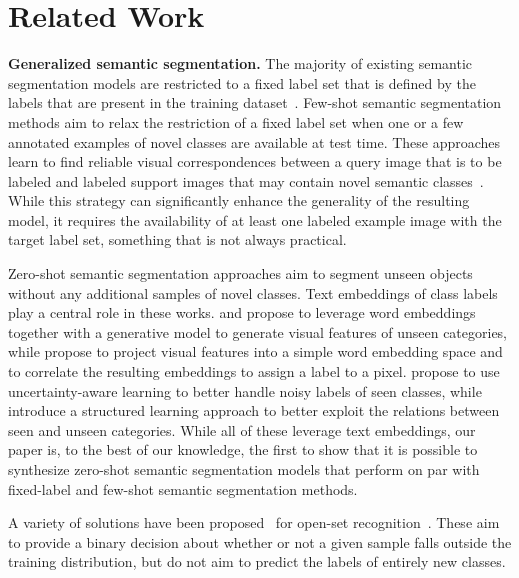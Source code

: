 \section{Related Work}
\label{sec:related_work}

\textbf{Generalized semantic segmentation.}
The majority of existing semantic segmentation models are restricted to a fixed label set that is defined by the labels that are present in the training dataset~\citep{minaee2021image}. 
Few-shot semantic segmentation methods aim to relax the restriction of a fixed label set when one or a few annotated examples of novel classes are available at test time. These approaches learn to find reliable visual correspondences between a query image that is to be labeled and labeled support images that may contain novel semantic classes~\citep{shaban2017one,rakelly2018conditional,siam2019amp,wang2019panet,zhang2019pyramid,nguyen2019feature,liu2020part,wang2020few,tian2020prior,wang2020few, tian2020prior,boudiaf2021few, min2021hypercorrelation}. While this strategy can significantly enhance the generality of the resulting model, it requires the availability of at least one labeled example image with the target label set, something that is not always practical.

Zero-shot semantic segmentation approaches aim to segment unseen objects without any additional samples of novel classes. Text embeddings of class labels play a central role in these works. \citet{bucher2019zero} and \citet{Gu2020CaGNet} propose to leverage word embeddings together with a generative model to generate visual features of unseen categories, while \citet{xian2019semantic} propose to project visual features into a simple word embedding space and to correlate the resulting embeddings to assign a label to a pixel. \citet{hu2020uncertainty} propose to use uncertainty-aware learning to better handle noisy labels of seen classes, while \citet{li2020consistent} introduce a structured learning approach to better exploit the relations between seen and unseen categories. While all of these leverage text embeddings, our paper is, to the best of our knowledge, the first to show that it is possible to synthesize zero-shot semantic segmentation models that perform on par with fixed-label and few-shot semantic segmentation methods.

A variety of solutions have been proposed~\citep{zhang2020hybrid,liu2020few,perera2020generative,zhou2021learning} for open-set recognition~\citep{scheirer2012toward,geng2020recent}. These aim to provide a binary decision about whether or not a given sample falls outside the training distribution, but do not aim to predict the labels of entirely new classes.

